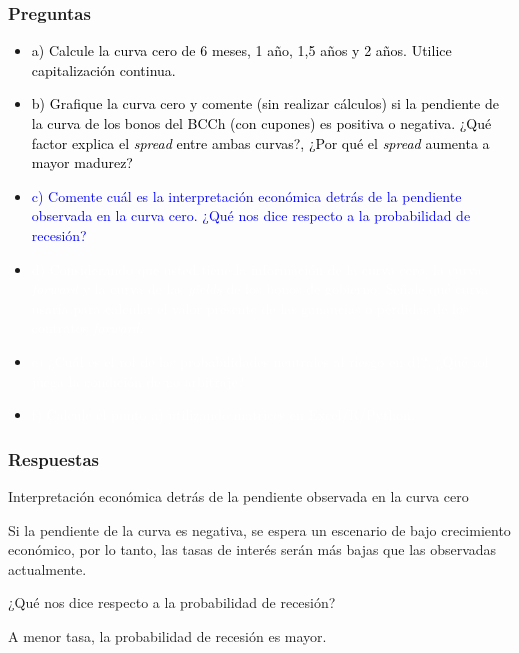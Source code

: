 \documentclass{beamer}
\newif\ifpresentacion
\newcommand{\pausa}{\ifpresentacion\pause\fi}
\begin{document}
\begin{frame}
  \frametitle{Preguntas}
  \begin{itemize}
    \scriptsize
    \item {\textcolor{black}{a) Calcule la curva cero de 6 meses, 1 año, 1,5 años y 2 años. Utilice capitalización continua.}}
    \vspace{3pt}
    \item {\textcolor{black}{b) Grafique la curva cero y comente (sin realizar cálculos) si la pendiente de la curva de los bonos del BCCh (con cupones) es positiva o negativa. ¿Qué factor explica el \textit{spread} entre ambas curvas?, ¿Por qué el \textit{spread} aumenta a mayor madurez?}}
    \vspace{3pt}
    \item {\Large\textcolor{blue}{c) Comente cuál es la interpretación económica detrás de la pendiente observada en la curva cero. 
    ¿Qué nos dice respecto a la probabilidad de recesión?}}
    \vspace{3pt}
    \item {\textcolor{white}{d) Considerando que usted tiene la información de la curva cero, la curva \textit{forward} y la curva de las \textit{yields} de los bonos de gobierno. Señale qué curva usaría para calcular el valor presente de las ganancias o pérdidas de los contratos \textit{forward}.}}
    \vspace{3pt}
    \item {\textcolor{white}{e) ¿Cuál es el rol de las probabilidades neutrales al riesgo en d)?, ¿Qué rol juega la condición de no arbitraje?}}
    \vspace{3pt}
    \item {\textcolor{white}{f) Calcule el punto a) utilizando matrices en Excel/R/Python.}}
    \vspace{3pt}
  \end{itemize}
\end{frame}

\begin{frame}
  \frametitle{Respuestas }
  \begin{block}{Interpretación económica detrás de la pendiente observada en la curva cero}
    \pausa
    Si la pendiente de la curva es negativa, se espera un escenario de bajo crecimiento
    económico, por lo tanto, las tasas de interés serán más bajas que las observadas
    actualmente.
  \end{block}
  \pausa
  \begin{block}{¿Qué nos dice respecto a la probabilidad de recesión?}
    \pausa
  A menor tasa, la probabilidad de recesión es mayor. 
  \end{block}
\end{frame}
\end{document}
